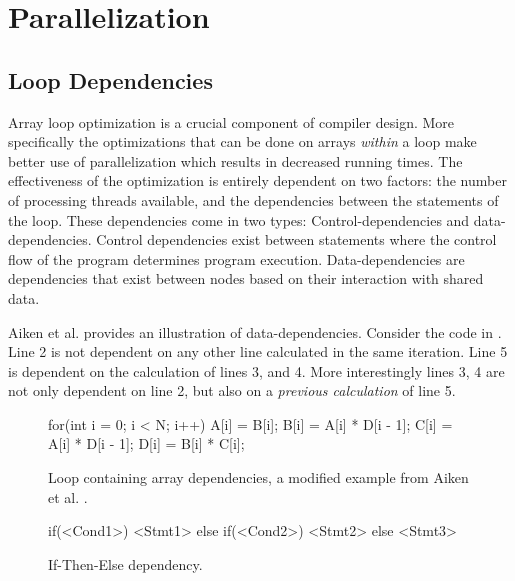 \section{Parallelization}
\label{sec:parallelization}

\subsection{Loop Dependencies} 
\label{sec:loopdependencies}

Array loop optimization is a crucial component of compiler design. More specifically
the optimizations that can be done on arrays \emph{within} a loop make better use of 
parallelization which results in decreased running times. The effectiveness of the 
optimization is entirely dependent on two factors: the number of processing threads
available, and the dependencies between the statements of the loop. These dependencies 
come in two types: Control-dependencies and data-dependencies. Control dependencies
exist between statements where the control flow of the program determines
program execution. Data-dependencies are dependencies that exist 
between nodes based on their interaction with shared data.

Aiken et al. \cite{Aiken1988} provides an illustration of data-dependencies. 
Consider the code in . Line 2 is not dependent on any other 
line calculated in the same iteration. Line 5 is dependent on the calculation 
of lines 3, and 4. More interestingly lines 3, 4 are not only dependent on line 2, 
but also on a \emph{previous calculation} of line 5. 

\begin{figure}[h]
\centering
\begin{minipage}{0.70\textwidth}
\begin{javacode}
	for(int i = 0; i < N; i++) {
		A[i] = B[i];
		B[i] = A[i] * D[i - 1];
		C[i] = A[i] * D[i - 1];
		D[i] = B[i] * C[i]; 
	}
\end{javacode}
\end{minipage}
\caption{Loop containing array dependencies, a modified example from Aiken et al. \cite{Aiken1988}.}
\label{fig:arrayloop}
\end{figure}

\begin{figure}[h]
\centering
\begin{minipage}{0.70\textwidth}
\begin{javacode}
  if(<Cond1>) {
      <Stmt1>
  } else if(<Cond2>) {
      <Stmt2>
  } else {
      <Stmt3>
  }
\end{javacode}
\end{minipage}
\caption{If-Then-Else dependency.}
\label{fig:ifthenelsedep}
\end{figure}


